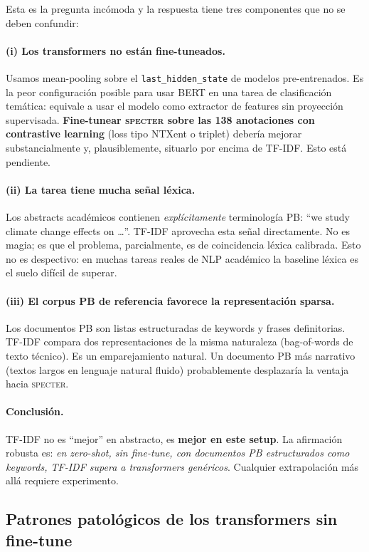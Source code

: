 \documentclass[11pt,a4paper]{article}
\begin{document}
Esta es la pregunta incómoda y la respuesta tiene tres componentes que no se deben confundir:

\paragraph{(i) Los transformers no están fine-tuneados.}
Usamos mean-pooling sobre el \texttt{last\_hidden\_state} de modelos pre-entrenados. Es la peor configuración posible para usar BERT en una tarea de clasificación temática: equivale a usar el modelo como extractor de features sin proyección supervisada. \textbf{Fine-tunear \textsc{specter} sobre las 138 anotaciones con contrastive learning} (loss tipo NTXent o triplet) debería mejorar substancialmente y, plausiblemente, situarlo por encima de TF-IDF. Esto está pendiente.

\paragraph{(ii) La tarea tiene mucha señal léxica.}
Los abstracts académicos contienen \emph{explícitamente} terminología PB: ``we study climate change effects on \ldots''. TF-IDF aprovecha esta señal directamente. No es magia; es que el problema, parcialmente, es de coincidencia léxica calibrada. Esto no es despectivo: en muchas tareas reales de NLP académico la baseline léxica es el suelo difícil de superar.

\paragraph{(iii) El corpus PB de referencia favorece la representación sparsa.}
Los documentos PB son listas estructuradas de keywords y frases definitorias. TF-IDF compara dos representaciones de la misma naturaleza (bag-of-words de texto técnico). Es un emparejamiento natural. Un documento PB más narrativo (textos largos en lenguaje natural fluido) probablemente desplazaría la ventaja hacia \textsc{specter}.

\paragraph{Conclusión.} TF-IDF no es ``mejor'' en abstracto, es \textbf{mejor en este setup}. La afirmación robusta es: \emph{en zero-shot, sin fine-tune, con documentos PB estructurados como keywords, TF-IDF supera a transformers genéricos}. Cualquier extrapolación más allá requiere experimento.

\subsection{Patrones patológicos de los transformers sin fine-tune}
\end{document}
